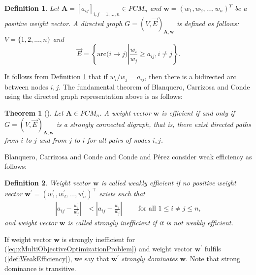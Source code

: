 \documentclass{article}
\theoremstyle{plain}
\newtheorem{definition}{Definition}[section]
\newtheorem{theorem}{Theorem}[section]
\begin{document}
\begin{definition} \label{def:DirectedGraphEfficient}  %
Let $\mathbf{A} =
\left[
a_{ij}
\right]_{i,j=1,\ldots,n} \in PCM_n$  and
$\mathbf{w} = (w_1, w_2, \ldots, w_n)^{T}$ be a positive weight vector.
 A directed graph $G=(V,\overrightarrow{E})_{\mathbf{A},\mathbf{w}}$ is def{\kern0pt}ined as follows:
$V=\{1,2,\ldots,n\} $ and
\[
 \overrightarrow{E} = \left\{ \text{arc(}  i \rightarrow j\text{)}   \left|  \frac{w_i}{w_j} \geq a_{ij}, i \neq j \right. \right\}.
\]
\end{definition}
It follows from Def{\kern0pt}inition \ref{def:DirectedGraphEfficient} that if $w_i/w_j=a_{ij}$, then there is a bidirected arc between nodes $i,j$.
The fundamental theorem of Blanquero, Carrizosa and Conde using the directed graph representation above is as follows:
\begin{theorem}[{\cite[Corollary 10]{BlanqueroCarrizosaConde2006}}] \label{thm:TheoremDirectedGraphEfficient}
Let $\mathbf{A} \in {PCM}_n$.
A weight vector $\mathbf{w}$ is ef{\kern0pt}f{\kern0pt}icient if and only if
$G=(V,\overrightarrow{E})_{\mathbf{A},\mathbf{w}}$
is  a strongly connected digraph, that is,
there exist directed paths from $i$ to $j$ and from $j$ to $i$ for all
pairs of  nodes  $i , j$.
\end{theorem}

Blanquero, Carrizosa and Conde {\cite[Remark 12]{BlanqueroCarrizosaConde2006}}
and Conde and P\'erez \cite[Theorem 2.2]{CondePerez2010} consider weak ef{\kern0pt}f{\kern0pt}iciency as follows:
\begin{definition} \label{def:DefinitionWeaklyEfficient}  %
Weight vector $\mathbf{w}$ is called \emph{weakly
ef{\kern0pt}f{\kern0pt}icient} if no positive weight vector
$\mathbf{w^{\prime}} = (w^{\prime}_1, w^{\prime}_2, \ldots,
w^{\prime}_n)^{\top}$ exists such that
\begin{align}
 \left|a_{ij} - \frac{w^{\prime}_i}{w^{\prime}_j} \right| &< \left|a_{ij} - \frac{w_i}{w_j} \right| \qquad \text{ for all } 1 \leq i \neq j \leq n, \label{def:WeakEfficiency}    %
\end{align}
and weight vector $\mathbf{w}$ is called \emph{strongly inef{\kern0pt}f{\kern0pt}icient} if it is not weakly ef{\kern0pt}f{\kern0pt}icient. \\
\end{definition}

If weight vector $\mathbf{w}$ is strongly inef{\kern0pt}f{\kern0pt}icient
for  (\ref{eq:xMultiObjectiveOptimizationProblem}) and weight vector
$\mathbf{w^{\prime}}$ fulf{\kern0pt}ils (\ref{def:WeakEfficiency}),
we say that $\mathbf{w^{\prime}}$ \emph{strongly dominates} $\mathbf{w}$.
Note that strong dominance is transitive.
\end{document}
